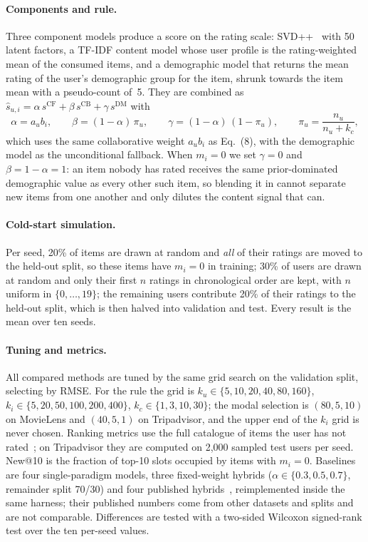 \paragraph{Components and rule.} Three component models produce a score on the rating scale: SVD++~\cite{koren2008} with 50 latent factors, a TF-IDF content model whose user profile is the rating-weighted mean of the consumed items, and a demographic model that returns the mean rating of the user's demographic group for the item, shrunk towards the item mean with a pseudo-count of~5. They are combined as $\hat{s}_{u,i} = \alpha\, s^{\mathrm{CF}} + \beta\, s^{\mathrm{CB}} + \gamma\, s^{\mathrm{DM}}$ with
\begin{equation}
  \alpha = a_u b_i, \qquad
  \beta = (1-\alpha)\,\pi_u, \qquad
  \gamma = (1-\alpha)\,(1-\pi_u), \qquad
  \pi_u = \frac{n_u}{n_u + k_c},
  \label{eq:newitem-rule}
\end{equation}
which uses the same collaborative weight $a_u b_i$ as Eq.~(8), with the demographic model as the unconditional fallback. When $m_i = 0$ we set $\gamma = 0$ and $\beta = 1 - \alpha = 1$: an item nobody has rated receives the same prior-dominated demographic value as every other such item, so blending it in cannot separate new items from one another and only dilutes the content signal that can.

\paragraph{Cold-start simulation.} Per seed, 20\% of items are drawn at random and \emph{all} of their ratings are moved to the held-out split, so these items have $m_i = 0$ in training; 30\% of users are drawn at random and only their first $n$ ratings in chronological order are kept, with $n$ uniform in $\{0,\dots,19\}$; the remaining users contribute 20\% of their ratings to the held-out split, which is then halved into validation and test. Every result is the mean over ten seeds.

\paragraph{Tuning and metrics.} All compared methods are tuned by the same grid search on the validation split, selecting by RMSE. For the rule the grid is $k_u \in \{5,10,20,40,80,160\}$, $k_i \in \{5,20,50,100,200,400\}$, $k_c \in \{1,3,10,30\}$; the modal selection is $(80,5,10)$ on MovieLens and $(40,5,1)$ on Tripadvisor, and the upper end of the $k_i$ grid is never chosen. Ranking metrics use the full catalogue of items the user has not rated~\cite{krichene2020}; on Tripadvisor they are computed on 2{,}000 sampled test users per seed. New@10 is the fraction of top-10 slots occupied by items with $m_i = 0$. Baselines are four single-paradigm models, three fixed-weight hybrids ($\alpha \in \{0.3, 0.5, 0.7\}$, remainder split 70/30) and four published hybrids~\cite{tarek2022,do2020,ohwsf2025,slarec2026}, reimplemented inside the same harness; their published numbers come from other datasets and splits and are not comparable. Differences are tested with a two-sided Wilcoxon signed-rank test over the ten per-seed values.

